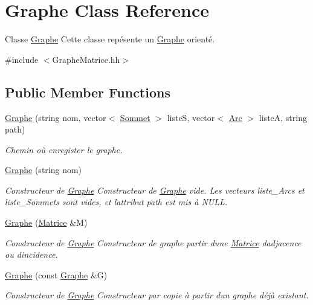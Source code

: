 \hypertarget{classGraphe}{}\section{Graphe Class Reference}
\label{classGraphe}


Classe \hyperlink{classGraphe}{Graphe} Cette classe rep\'{e}sente un \hyperlink{classGraphe}{Graphe} orient\'{e}.  




{\ttfamily \#include $<$Graphe\+Matrice.\+hh$>$}

\subsection*{Public Member Functions}
\begin{DoxyCompactItemize}
\item 
\hyperlink{classGraphe_ad2f9489948e74e09a50206604e3094a6}{Graphe} (string nom, vector$<$ \hyperlink{classSommet}{Sommet} $>$ listeS, vector$<$ \hyperlink{classArc}{Arc} $>$ listeA, string path)
\begin{DoxyCompactList}\small\item\em Chemin où enregister le graphe. \end{DoxyCompactList}\item 
\hyperlink{classGraphe_a08c0cf19eaf01a97a976ab76d7e0df7b}{Graphe} (string nom)
\begin{DoxyCompactList}\small\item\em Constructeur de \hyperlink{classGraphe}{Graphe} Constructeur de \hyperlink{classGraphe}{Graphe} vide. Les vecteurs liste\+\_\+\+Arcs et liste\+\_\+\+Sommets sont vides, et l\textquotesingle{}attribut path est mis \`{a} N\+U\+LL. \end{DoxyCompactList}\item 
\hyperlink{classGraphe_a8d0d20eb7e5d2f4edb5a95d5dbfd1c87}{Graphe} (\hyperlink{classMatrice}{Matrice} \&M)
\begin{DoxyCompactList}\small\item\em Constructeur de \hyperlink{classGraphe}{Graphe} Constructeur de graphe  partir d\textquotesingle{}une \hyperlink{classMatrice}{Matrice} d\textquotesingle{}adjacence ou d\textquotesingle{}incidence. \end{DoxyCompactList}\item 
\hyperlink{classGraphe_a997c9551ac4c6416d2ea587c1a4f1206}{Graphe} (const \hyperlink{classGraphe}{Graphe} \&G)
\begin{DoxyCompactList}\small\item\em Constructeur de \hyperlink{classGraphe}{Graphe} Constructeur par copie \`{a} partir d\textquotesingle{}un graphe d\'{e}j\`{a} existant. \end{DoxyCompactList}\item 

\end{DoxyCompactItemize}
